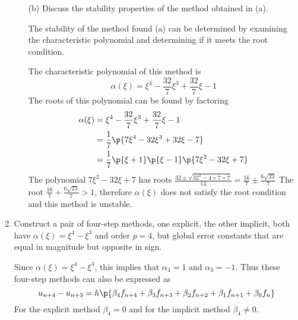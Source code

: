 \documentclass[11pt]{article}
\begin{document}
\begin{enumerate}
\begin{enumerate}
            \item[(b)]
                Discuss the stability properties of the method obtained in (a).


                The stability of the method found (a) can be determined by examining
                the characteristic polynomial and determining if it meets the root
                condition.

                The characteristic polynomial of this method is
                \[
                    \alpha(\xi) = \xi^4 - \frac{32}{7} \xi^3 + \frac{32}{7}\xi - 1
                \]
                The roots of this polynomial can be found by factoring
                \begin{align*}
                    \alpha(\xi) &= \xi^4 - \frac{32}{7} \xi^3 + \frac{32}{7}\xi - 1 \\
                    &= \frac{1}{7}\p{7\xi^4 - 32 \xi^3 + 32\xi - 7} \\
                    &= \frac{1}{7}\p{\xi + 1}\p{\xi - 1}\p{7\xi^2 - 32\xi + 7} \\
                \end{align*}
                The polynomial $7\xi^2 - 32\xi + 7$ has roots
                $\frac{32 \pm \sqrt{32^2 - 4\times7\times7}}{14} = \frac{16}{7} \pm \frac{6\sqrt{23}}{7}$
                The root $\frac{16}{7} + \frac{6\sqrt{23}}{7} > 1$, therefore $\alpha(\xi)$
                does not satisfy the root condition and this method is unstable.
        \end{enumerate}

    \item %
        Construct a pair of four-step methods, one explicit, the other implicit,
        both have $\alpha(\xi) = \xi^4 - \xi^3$ and order $p = 4$,
        but global error constants that are equal in magnitude but opposite in
        sign.


        Since $\alpha(\xi) = \xi^4 - \xi^3$, this implies that $\alpha_4 = 1$
        and $\alpha_3 = -1$.
        Thus these four-step methods can also be expressed as
        \[
            u_{n+4} - u_{n+3} = h\p{\beta_4 f_{n+4} + \beta_3 f_{n+3} +
                \beta_2 f_{n+2} + \beta_1 f_{n+1} + \beta_0 f_n}
        \]
        For the explicit method $\beta_4 = 0$ and for the implicit method
        $\beta_4 \neq 0$.


\end{enumerate}
\end{document}
